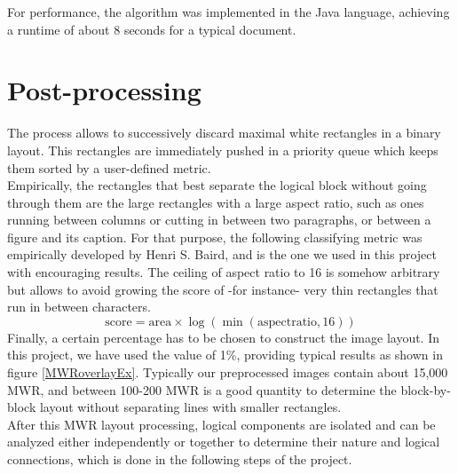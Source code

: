 \documentclass{report}
\begin{document}
For performance, the algorithm was implemented in the Java language, achieving a runtime of about 8 seconds for a typical document.

\section{Post-processing}
The process allows to successively discard maximal white rectangles in a binary layout. This rectangles are immediately pushed in a priority
queue which keeps them sorted by a user-defined metric.\\
Empirically, the rectangles that best separate the logical block without going through them are the large rectangles with a large aspect ratio,
such as ones running between columns or cutting in between two paragraphs, or between a figure and its caption. For that purpose, the following
classifying metric was empirically developed by Henri S. Baird, and is the one we used in this project with encouraging results. The ceiling of
aspect ratio to 16 is somehow arbitrary but allows to avoid growing the score of -for instance- very thin rectangles that run in between
characters.
\[
\mathrm{score} = \mathrm{area} \times \log(\min(\mathrm{aspect ratio}, 16))
\]
Finally, a certain percentage has to be chosen to construct the image layout. In this project, we have used the value of 1\%, providing typical
results as shown in figure \ref{MWRoverlayEx}. Typically our preprocessed images contain about 15,000 MWR, and between 100-200 MWR is a good
quantity to determine the block-by-block layout without separating lines with smaller rectangles.\\

After this MWR layout processing, logical components are isolated and can be analyzed either independently or together to determine their nature
and logical connections, which is done in the following steps of the project.
\end{document}
